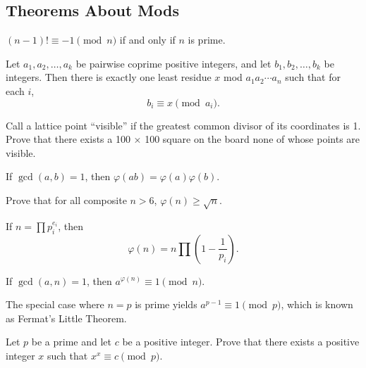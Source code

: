 \subsection{Theorems About Mods}
\begin{result}{\label{r:i:n:t:1}}
  $(n-1)!\equiv -1\pmod n$ if and only if $n$ is prime.
\end{result}
\begin{result}{\label{r:i:n:t:2}}
    Let $a_1,a_2,\ldots,a_k$ be pairwise coprime positive integers, and let
    $b_1,b_2,\ldots,b_k$ be integers. Then there is exactly one least
    residue $x$ mod $a_1a_2\cdots a_n$ such that for each $i$,
    \[b_i\equiv x\pmod {a_i}.\]
\end{result}
\begin{problem}{\label{p:i:n:t:1}}
    Call a lattice point ``visible'' if the greatest
    common divisor of its coordinates is 1. Prove that there exists a 100 × 100
    square on the board none of whose points are visible.
\end{problem}
\begin{result}{\label{r:i:n:t:3}}
    If $\gcd(a,b)=1$, then $\varphi(ab)=\varphi(a)\varphi(b)$.
\end{result}
\begin{problem}{\label{p:i:n:t:2}}
    Prove that for all composite $n>6$, $\varphi(n)\ge\sqrt n$.
\end{problem}
\begin{result}{\label{r:i:n:t:4}}
    If $n=\prod p_i^{e_i}$, then
    \[\varphi(n)=n\prod\left(1-\frac 1{p_i}\right).\]
\end{result}
\begin{result}{\label{r:i:n:t:5}}
    If $\gcd(a,n)=1$, then $a^{\varphi(n)}\equiv 1\pmod n$.
\end{result}
The special case where $n=p$ is prime yields $a^{p-1}\equiv 1\pmod p$, which is
known as Fermat's Little Theorem.
\begin{problem}{\label{p:i:n:t:3}}
  Let $p$ be a prime and let $c$ be a positive integer. Prove that there
    exists a positive integer $x$ such that $x^x\equiv c\pmod p$.
\end{problem}
